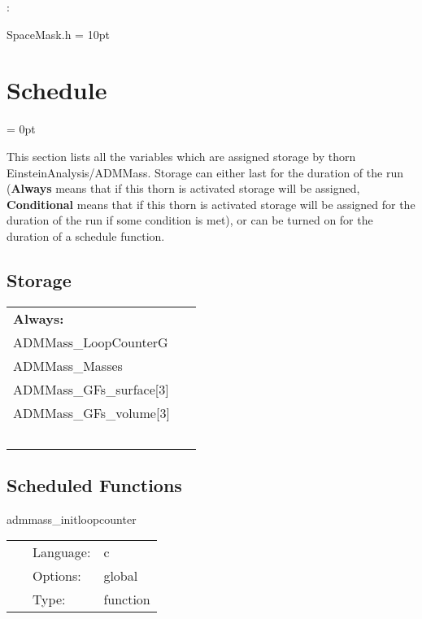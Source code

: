 : 

SpaceMask.h
\vspace{2mm}\parskip = 10pt 

\section{Schedule} 


\parskip = 0pt


\noindent This section lists all the variables which are assigned storage by thorn EinsteinAnalysis/ADMMass.  Storage can either last for the duration of the run ({\bf Always} means that if this thorn is activated storage will be assigned, {\bf Conditional} means that if this thorn is activated storage will be assigned for the duration of the run if some condition is met), or can be turned on for the duration of a schedule function.


\subsection*{Storage}

\hspace{5mm}

 \begin{tabular*}{160mm}{ll} 

{\bf Always:}&  ~ \\ 
 ADMMass\_LoopCounterG & ~\\ 
 ADMMass\_Masses & ~\\ 
 ADMMass\_GFs\_surface[3] & ~\\ 
 ADMMass\_GFs\_volume[3] & ~\\ 
~ & ~\\ 
\end{tabular*} 


\subsection*{Scheduled Functions}
\vspace{5mm}


\hspace{5mm} admmass\_initloopcounter 

\hspace{5mm}{\it initialise the loop counter for admmass } 


\hspace{5mm}

 \begin{tabular*}{160mm}{cll} 
~ & Language:  & c \\ 
~ & Options:  & global \\ 
~ & Type:  & function \\ 
\end{tabular*} 


